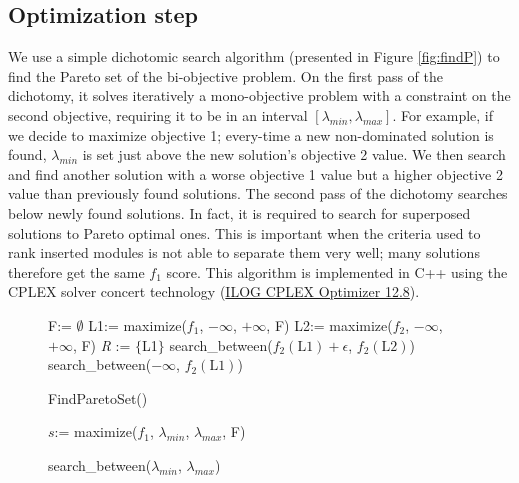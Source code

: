 \documentclass{bioinfo}
\begin{document}
\begin{methods}
\subsection{Optimization step}
We use a simple dichotomic search algorithm (presented in Figure \ref{fig:findP}) to find the Pareto set of the bi-objective problem. On the first pass of the dichotomy, it solves iteratively a mono-objective problem with a constraint on the second objective, requiring it to be in an interval $[\lambda_{min}, \lambda_{max}]$. For example, if we decide to maximize objective 1; every-time a new non-dominated solution is found, $\lambda_{min}$ is set just above the new solution's objective 2 value. We then search and find another solution with a worse objective 1 value but a higher objective 2 value than previously found solutions. The second pass of the dichotomy searches below newly found solutions. In fact, it is required to search for superposed solutions to Pareto optimal ones. This is important when the criteria used to rank inserted modules is not able to separate them very well; many solutions therefore get the same $f_1$ score. This algorithm is implemented  in C++ using the CPLEX solver concert technology (\href{https://www.ibm.com/analytics/optimization-modeling-interfaces}{ILOG CPLEX Optimizer 12.8}).
\begin{figure}[!tbp]
\begin{algorithm}[H]
F:= $\emptyset$\;
L1:= maximize($f_1$, $-\infty$, $+\infty$, F)\;
L2:= maximize($f_2$, $-\infty$, $+\infty$, F)\;
\textit{R} := $\{$L1$\}$\;
search\_between($f_2(\text{L1}) + \epsilon$, $f_2(\text{L2})$)\;
search\_between($-\infty$, $f_2(\text{L1})$)\;
\;
\caption{FindParetoSet()}
\end{algorithm}

\begin{algorithm}[H]
$s$:= maximize($f_1$, $\lambda_{min}$, $\lambda_{max}$, F)\;
\caption{search\_between($\lambda_{min}$, $\lambda_{max}$)}
\end{algorithm}


\end{figure}
\end{methods}
\end{document}
